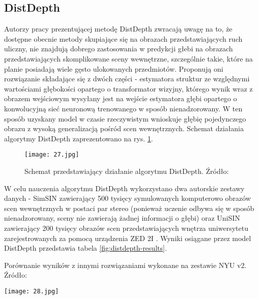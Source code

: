 \subsection{DistDepth}
Autorzy pracy prezentującej metodę DistDepth \cite{wu2022practical} zwracają uwagę na to, że dostępne obecnie metody skupiające się na obrazach przedstawiających ruch uliczny, nie znajdują dobrego zastosowania w predykcji głebi na obrazach przedstawiających skomplikowane sceny wewnętrzne, szczególnie takie, które na planie posiadają wiele gęsto ulokowanych przedmiotów. Proponują oni rozwiązanie składające się z dwóch części - estymatora struktur ze względnymi wartościami głębokości opartego o transformator wizyjny, którego wynik wraz z obrazem wejściowym wysyłany jest na wejście estymatora głębi opartego o konwolucyjną sieć neuronową trenowanego w sposób nienadzorowany. W ten sposób uzyskany model w czasie rzeczywistym wnioskuje głębię pojedynczego obrazu z wysoką generalizacją pośród scen wewnętrznych. Schemat działania algorytmy DistDepth zaprezentowano na rys. \ref{fig:distdepth-teaser}.
\begin{figure}[H]
    \centering
    \texttt{[image: 27.jpg]}
    \caption{Schemat przedstawiający działanie algorytmu DistDepth. Źródło: \cite{wu2022practical}}
    \label{fig:distdepth-teaser}
\end{figure}
W celu nauczenia algorytmu DistDepth wykorzystano dwa autorskie zestawy danych - SimSIN zawierający 500 tysięcy symulowanych komputerowo obrazów scen wewnętrznych w postaci par stereo (ponieważ uczenie odbywa się w sposób nienadzorowany, sceny nie zawierają żadnej informacji o głębi) oraz UniSIN zawierający 200 tysięcy obrazów scen przedstawiających wnętrza uniwersytetu zarejestrowanych za pomocą urządzenia ZED 2I \cite{ZED2I}. Wyniki osiągane przez model DistDepth przedstawia tabela \ref{fig:distdepth-results}.
\begin{table}[H]
    \centering
    \caption{Porównanie wyników z innymi rozwiązaniami wykonane na zestawie NYU v2. Źródło: \cite{wu2022practical}}
    \texttt{[image: 28.jpg]}
    \label{fig:distdepth-results}
\end{table}

